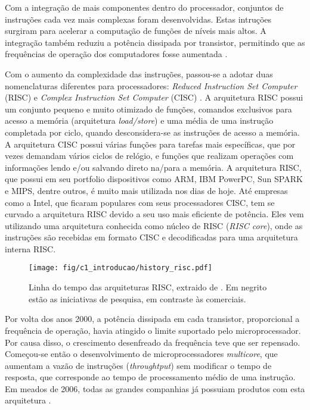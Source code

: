 \documentclass[11pt,a4paper,oneside]{book}
\begin{document}
Com a integra\c{c}\~ao de mais componentes dentro do processador, conjuntos de instru\c{c}\~oes cada vez mais complexas foram desenvolvidas.
Estas intru\c{c}\~oes surgiram para acelerar a computa\c{c}\~ao de fun\c{c}\~oes de n\'iveis mais altos.
A integra\c{c}\~ao tamb\'em reduziu a pot\^encia dissipada por transistor, permitindo que as frequ\^encias de opera\c{c}\~ao dos computadores fosse aumentada \cite{Hennessy2011}.

Com o aumento da complexidade das instruções, passou-se a adotar duas nomenclaturas diferentes para processadores: \textit{Reduced Instruction Set Computer} (RISC) e \textit{Complex Instruction Set Computer} (CISC) \cite{Fedeli2003}.
A arquitetura RISC possui um conjunto pequeno e muito otimizado de funções, comandos exclusivos para acesso a memória (arquitetura \textit{load/store}) e uma média de uma instrução completada por ciclo, quando desconsidera-se as instruções de acesso a memória.
A arquitetura CISC possui várias funções para tarefas mais específicas, que por vezes demandam vários ciclos de relógio, e funções que realizam operações com informações lendo e/ou salvando direto na/para a memória.
A arquitetura RISC, que possui em seu portfolio dispositivos como ARM, IBM PowerPC, Sun SPARK e MIPS, dentre outros, é muito mais utilizada nos dias de hoje.
Até empresas como a Intel, que ficaram populares com seus processadores CISC, tem se curvado a arquitetura RISC devido a seu uso mais eficiente de potência.
Eles vem utilizando uma arquitetura conhecida como núcleo de RISC (\textit{RISC core}), onde as instruções são recebidas em formato CISC e decodificadas para uma arquitetura interna RISC.

\begin{figure}[h]
\centering
\texttt{[image: fig/c1\_introducao/history\_risc.pdf]}
\caption{Linha do tempo das arquiteturas RISC, extraido de \cite{Hennessy2011}. Em negrito estão as iniciativas de pesquisa, em contraste às comerciais.}
\label{fig:history_risc}
\end{figure}

Por volta dos anos 2000, a pot\^encia dissipada em cada transistor, proporcional a frequência de opera\c{c}\~ao, havia atingido o limite suportado pelo microprocessador.
Por causa disso, o crescimento desenfreado da frequ\^encia teve que ser repensado.
Come\c{c}ou-se ent\~ao o desenvolvimento de microprocessadores \textit{multicore}, que aumentam a vaz\~ao de instru\c{c}\~oes (\textit{throughtput}) sem modificar o tempo de resposta, que corresponde ao tempo de processamento médio de uma instrução.
Em meados de 2006, todas as grandes companhias j\'a possuiam produtos com esta arquitetura \cite{Hennessy2011}.
\end{document}
